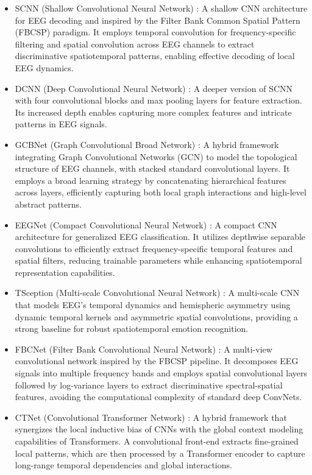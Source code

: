 \documentclass[journal]{IEEEtran}
\theoremstyle{plain}
\begin{document}
\begin{itemize}
\item SCNN (Shallow Convolutional Neural Network) \cite{schirrmeister2017deep}: A shallow CNN architecture for EEG decoding and inspired by the Filter Bank Common Spatial Pattern (FBCSP) paradigm. It employs temporal convolution for frequency-specific filtering and spatial convolution across EEG channels to extract discriminative spatiotemporal patterns, enabling effective decoding of local EEG dynamics.
\item DCNN (Deep Convolutional Neural Network) \cite{schirrmeister2017deep}: A deeper version of SCNN with four convolutional blocks and max pooling layers for feature extraction. Its increased depth enables capturing more complex features and intricate patterns in EEG signals.
\item GCBNet (Graph Convolutional Broad Network) \cite{zhang2019gcb}: A hybrid framework integrating Graph Convolutional Networks (GCN) to model the topological structure of EEG channels, with stacked standard convolutional layers. It employs a broad learning strategy by concatenating hierarchical features across layers, efficiently capturing both local graph interactions and high-level abstract patterns.
\item EEGNet (Compact Convolutional Neural Network) \cite{lawhern2018eegnet}: A compact CNN architecture for generalized EEG classification. It utilizes depthwise separable convolutions to efficiently extract frequency-specific temporal features and spatial filters, reducing trainable parameters while enhancing spatiotemporal representation capabilities.
\item TSception (Multi-scale Convolutional Neural Network) \cite{ding2022tsception}: A multi-scale CNN that models EEG’s temporal dynamics and hemispheric asymmetry using dynamic temporal kernels and asymmetric spatial convolutions, providing a strong baseline for robust spatiotemporal emotion recognition.
\item FBCNet (Filter Bank Convolutional Neural Network) \cite{mane2021fbcnet}: A multi-view convolutional network inspired by the FBCSP pipeline. It decomposes EEG signals into multiple frequency bands and employs spatial convolutional layers followed by log-variance layers to extract discriminative spectral-spatial features, avoiding the computational complexity of standard deep ConvNets.
\item CTNet (Convolutional Transformer Network) \cite{zhao2024ctnet}: A hybrid framework that synergizes the local inductive bias of CNNs with the global context modeling capabilities of Transformers. A convolutional front-end extracts fine-grained local patterns, which are then processed by a Transformer encoder to capture long-range temporal dependencies and global interactions.

\end{itemize}
\end{document}
